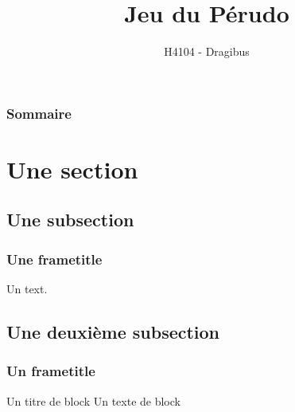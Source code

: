 \documentclass{beamer}
\title{Jeu du Pérudo}
\author{H4104 - Dragibus}
\institute{INSA de Lyon}
\begin{document}
\begin{frame}
    \titlepage
\end{frame}

\begin{frame}
    \frametitle{Sommaire}
    \tableofcontents[hideallsubsections]
\end{frame}

\section{Une section}

\subsection{Une subsection}

\begin{frame}
    \frametitle{Une frametitle}
    Un text.
\end{frame}

\subsection{Une deuxième subsection}
\begin{frame}
    \frametitle{Un frametitle}
    \begin{block}{Un titre de block}
        Un texte de block
    \end{block}
\end{frame}
\end{document}
